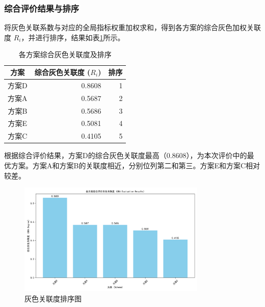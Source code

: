 \documentclass[12pt]{ctexart}
\begin{document}
\subsubsection{综合评价结果与排序}
将灰色关联系数与对应的全局指标权重加权求和，得到各方案的综合灰色加权关联度 \(R_i\)，并进行排序，结果如表\ref{tab:final_ranking}所示。

\begin{table}[H]
  \centering
  \caption{各方案综合灰色关联度及排序}
  \label{tab:final_ranking}
  \begin{tabular}{crr}
    \toprule
    方案 & 综合灰色关联度 (\(R_i\)) & 排序 \\
    \midrule
    方案D & 0.8608 & 1 \\
    方案A & 0.5687 & 2 \\
    方案B & 0.5686 & 3 \\
    方案E & 0.5081 & 4 \\
    方案C & 0.4105 & 5 \\
    \bottomrule
  \end{tabular}
\end{table}
根据综合评价结果，方案D的综合灰色关联度最高（0.8608），为本次评价中的最优方案。方案A和方案B的关联度相近，分别位列第二和第三。方案E和方案C相对较差。
\begin{figure}[H]
  \centering
  \includegraphics[width=0.8\textwidth]{../fig_综合评价结果_v2/GRA_Results_Comparison.png}
  \caption{灰色关联度排序图}
  \label{fig:gra_ranking}
\end{figure}
\end{document}
